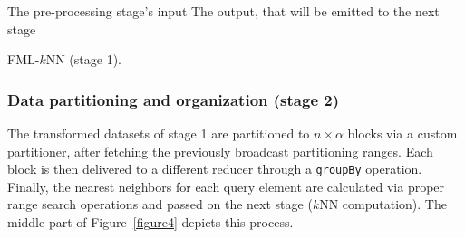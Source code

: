 \begin{algorithm}[!ht]
\begin{small}
	\DontPrintSemicolon
	\Comment The pre-processing stage's input \;
	\Comment The output, that will be emitted to the next stage \;
	\BlankLine
	\caption{FML-$k$NN (stage 1).}
	\label{alg:single_session_algorithm_stage1}	
\end{small}
\end{algorithm}

\subsubsection{Data partitioning and organization (stage 2)}
\label{par:algorithmic2}
The transformed datasets of stage 1 are partitioned to $n \times \alpha$ blocks via a custom partitioner, after fetching the previously broadcast partitioning ranges. Each block is then delivered to a different reducer through a \texttt{groupBy} operation. Finally, the nearest neighbors for each query element are calculated via proper range search operations and passed on the next stage ($k$NN computation). The middle part of Figure~\ref{figure4} depicts this process.

